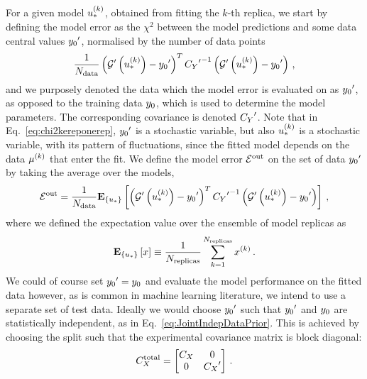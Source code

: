 For a given model $u_*^{(k)}$, obtained from fitting the $k$-th replica, we
start by defining the model error as the $\chi^2$ between the model predictions
and some data central values ${{y_0}^{\prime}}$, normalised by the number
of data points
\begin{equation}
    \label{eq:chi2kereponerep}
    \frac{1}{N_{\rm data}} 
        \left( {{\mathcal{G}}^{\prime}}\left(u_*^{(k)}\right) - {{y_0}^{\prime}} \right)^T
        {{C_{Y}}^{\prime}}^{-1}
        \left( {{\mathcal{G}}^{\prime}}\left(u_*^{(k)}\right) - {{y_0}^{\prime}} \right)\, ,
\end{equation}
and we purposely denoted the data which the model error is evaluated on as
${{y_0}^{\prime}}$, as opposed to the training data $y_0$,
which is used to determine the model parameters. The corresponding covariance is
denoted ${{C_{Y}}^{\prime}}$. Note that in Eq.~\ref{eq:chi2kereponerep},
${{y_0}^{\prime}}$ is a stochastic variable, but also $u_*^{(k)}$ is a
stochastic variable, with its pattern of fluctuations, since the fitted model
depends on the data $\mu^{(k)}$ that enter the fit. We define the
model error $\mathcal{E}^{\rm out}$ on the set of data ${{y_0}^{\prime}}$ by taking the
average over the models,
\begin{equation}
    \label{eq:chi2kerep}
    \mathcal{E}^{\rm out} = \frac{1}{N_{\rm data}} \mathbf{E}_{\{ u_* \}} \left[ 
        \left( {{\mathcal{G}}^{\prime}}\left(u_*^{(k)}\right) - {{y_0}^{\prime}} \right)^T
        {{C_{Y}}^{\prime}}^{-1}
        \left( {{\mathcal{G}}^{\prime}}\left(u_*^{(k)}\right) - {{y_0}^{\prime}} \right)
     \right]\, ,
\end{equation}
where we defined the expectation value over the ensemble of model replicas as
\begin{equation}
    \mathbf{E}_{\{ u_* \}} \left[ x \right] \equiv \frac{1}{N_{\rm replicas}} \sum_{k=1}^{N_{\rm replicas}} x^{(k)} \, .
\end{equation}
We could of course set ${{y_0}^{\prime}} = y_0$ and evaluate
the model performance on the fitted data however, as is common in machine
learning literature, we intend to use a separate set of test data. Ideally we
would choose ${{y_0}^{\prime}}$ such that ${{y_0}^{\prime}}$ and
$y_0$ are statistically independent, as in
Eq.~\ref{eq:JointIndepDataPrior}. This is achieved by choosing the split such
that the experimental covariance matrix is block diagonal:
\begin{equation}
    C_X^{\rm total} =
    \begin{bmatrix}
        C_X  & 0  \\ 
        0  & {{C_X}^{\prime}}  \\ 
    \end{bmatrix}\, .
\end{equation}


